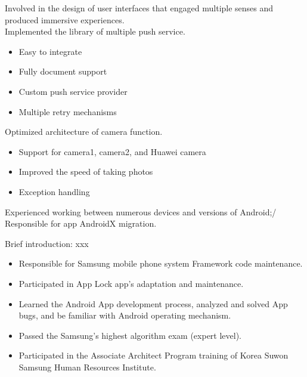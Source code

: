 \documentclass{resume}
\begin{document}
Involved in the design of user interfaces that engaged multiple senses and produced immersive experiences.\\
Implemented the library of multiple push service.
\begin{itemize}
  \item Easy to integrate
  \item Fully document support
  \item Custom push service provider
  \item Multiple retry mechanisms
\end{itemize}
Optimized architecture of camera function.
\begin{itemize}
  \item Support for camera1, camera2, and Huawei camera
  \item Improved the speed of taking photos
  \item Exception handling
\end{itemize}
Experienced working between numerous devices and versions of Android;/ Responsible for app AndroidX migration.

Brief introduction: xxx
\begin{itemize}
  \item Responsible for Samsung mobile phone system Framework code maintenance.
  \item Participated in App Lock app's adaptation and maintenance.
  \item Learned the Android App development process, analyzed and solved App bugs, and be familiar with Android operating mechanism.
  \item Passed the Samsung's highest algorithm exam (expert level).
  \item Participated in the Associate Architect Program training of Korea Suwon Samsung Human Resources Institute.
\end{itemize}

\end{document}
